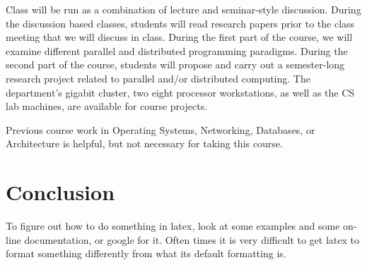 \documentclass[twocolumn]{article}
\begin{document}
Class will be run as a combination of lecture and seminar-style discussion. During the discussion based classes, students will read research papers prior to the class meeting that we will discuss in class. During the first part of the course, we will examine different parallel and distributed programming paradigms. During the second part of the course, students will propose and carry out a semester-long research project related to parallel and/or distributed computing. The department's gigabit cluster, two eight processor workstations, as well as the CS lab machines, are available for course projects.

Previous course work in Operating Systems, Networking, Databases, or Architecture is helpful, but not necessary for taking this course. 

\section{Conclusion}

To figure out how to do something in latex, look at some examples and some
on-line documentation, or google for it.  Often times it is very difficult
to get latex to format something differently from what its default formatting
is. 
\end{document}
